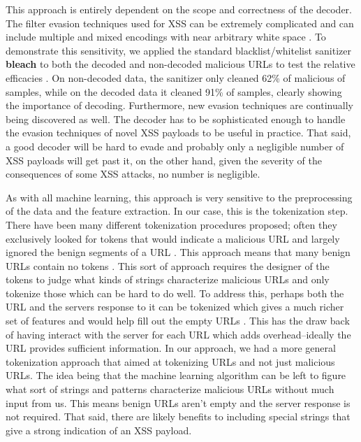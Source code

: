 This approach is entirely dependent on the scope and correctness of the decoder. The filter evasion techniques used for XSS can be extremely complicated and can include multiple and mixed encodings with near arbitrary white space \cite{xsscheat}. To demonstrate this sensitivity, we applied the standard blacklist/whitelist sanitizer \textbf{bleach} to both the decoded and non-decoded malicious URLs to test the relative efficacies \cite{bleach}. On non-decoded data, the sanitizer only cleaned 62\% of malicious of samples, while on the decoded data it cleaned 91\% of samples, clearly showing the importance of decoding. Furthermore, new evasion techniques are continually being discovered as well. The decoder has to be sophisticated enough to handle the evasion techniques of novel XSS payloads to be useful in practice. That said, a good decoder will be hard to evade and probably only a negligible number of XSS payloads will get past it, on the other hand, given the severity of the consequences of some XSS attacks, no number is negligible. 

As with all machine learning, this approach is very sensitive to the preprocessing of the data and the feature extraction. In our case, this is the tokenization step. There have been many different tokenization procedures proposed; often they exclusively looked for tokens that would indicate a malicious URL and largely ignored the benign segments of a URL \cite{fang2018deepxss}\cite{mokbal2019mlpxss}. This approach means that many benign URLs contain no tokens \cite{zhang2019cross}. This sort of approach requires the designer of the tokens to judge what kinds of strings characterize malicious URLs and only tokenize those which can be hard to do well. To address this, perhaps both the URL and the servers response to it can be tokenized which gives a much richer set of features and would help fill out the empty URLs \cite{zhang2019cross}. This has the draw back of having interact with the server for each URL which adds overhead--ideally the URL provides sufficient information. In our approach, we had a more general tokenization approach that aimed at tokenizing URLs and not just malicious URLs. The idea being that the machine learning algorithm can be left to figure what sort of strings and patterns characterize malicious URLs without much input from us. This means benign URLs aren't empty and the server response is not required. That said, there are likely benefits to including special strings that give a strong indication of an XSS payload. 

